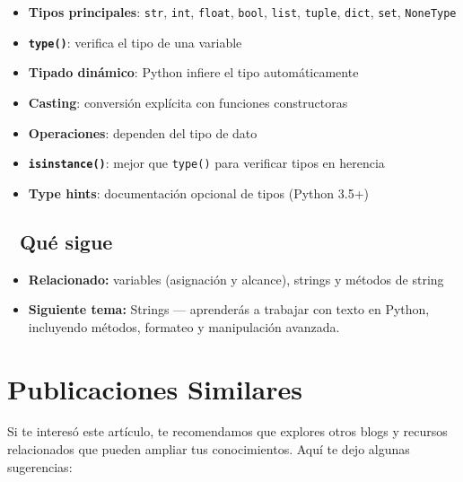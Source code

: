 \documentclass[
  doc,
  floatsintext,
  longtable,
  a4paper,
  nolmodern,
  notxfonts,
  notimes,
  12pt,
  colorlinks=true,linkcolor=blue,citecolor=blue,urlcolor=blue]{apa7}
\providecommand{\tightlist}{%
  \setlength{\itemsep}{0pt}\setlength{\parskip}{0pt}}
\begin{document}
\begin{itemize}
\tightlist
\item
  \textbf{Tipos principales}: \texttt{str}, \texttt{int},
  \texttt{float}, \texttt{bool}, \texttt{list}, \texttt{tuple},
  \texttt{dict}, \texttt{set}, \texttt{NoneType}
\item
  \textbf{\texttt{type()}}: verifica el tipo de una variable
\item
  \textbf{Tipado dinámico}: Python infiere el tipo automáticamente
\item
  \textbf{Casting}: conversión explícita con funciones constructoras
\item
  \textbf{Operaciones}: dependen del tipo de dato
\item
  \textbf{\texttt{isinstance()}}: mejor que \texttt{type()} para
  verificar tipos en herencia
\item
  \textbf{Type hints}: documentación opcional de tipos (Python 3.5+)
\end{itemize}

\subsection{🔗 Qué sigue}\label{quuxe9-sigue}

\begin{itemize}
\tightlist
\item
  \textbf{Relacionado:} variables (asignación y alcance), strings y
  métodos de string
\item
  \textbf{Siguiente tema:} Strings --- aprenderás a trabajar con texto
  en Python, incluyendo métodos, formateo y manipulación avanzada.
\end{itemize}

\section{Publicaciones Similares}\label{publicaciones-similares}

Si te interesó este artículo, te recomendamos que explores otros blogs y
recursos relacionados que pueden ampliar tus conocimientos. Aquí te dejo
algunas sugerencias:
\end{document}
